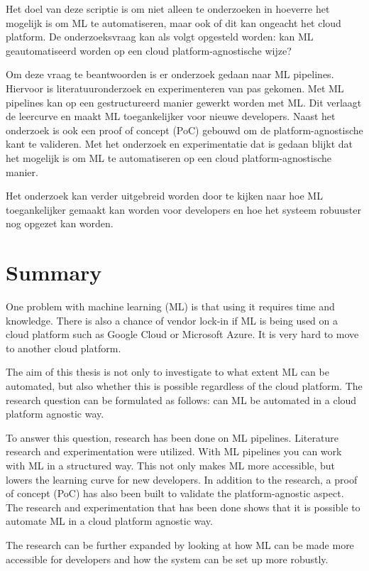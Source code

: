 Het doel van deze scriptie is om niet alleen te onderzoeken in hoeverre het mogelijk is om ML te automatiseren, maar ook of dit kan ongeacht het cloud platform. De onderzoeksvraag kan als volgt opgesteld worden: kan ML geautomatiseerd worden op een cloud platform-agnostische wijze?

Om deze vraag te beantwoorden is er onderzoek gedaan naar ML pipelines. Hiervoor is literatuuronderzoek en experimenteren van pas gekomen. Met ML pipelines kan op een gestructureerd manier gewerkt worden met ML. Dit verlaagt de leercurve en maakt ML toegankelijker voor nieuwe developers. Naast het onderzoek is ook een proof of concept (PoC) gebouwd om de platform-agnostische kant te valideren. Met het onderzoek en experimentatie dat is gedaan blijkt dat het mogelijk is om ML te automatiseren op een cloud platform-agnostische manier.

Het onderzoek kan verder uitgebreid worden door te kijken naar hoe ML toegankelijker gemaakt kan worden voor developers en hoe het systeem robuuster nog opgezet kan worden.

\newpage

\section*{Summary}
One problem with machine learning (ML) is that using it requires time and knowledge. There is also a chance of vendor lock-in if ML is being used on a cloud platform such as Google Cloud or Microsoft Azure. It is very hard to move to another cloud platform.

The aim of this thesis is not only to investigate to what extent ML can be automated, but also whether this is possible regardless of the cloud platform. The research question can be formulated as follows: can ML be automated in a cloud platform agnostic way.

To answer this question, research has been done on ML pipelines. Literature research and experimentation were utilized. With ML pipelines you can work with ML in a structured way. This not only makes ML more accessible, but lowers the learning curve for new developers. In addition to the research, a proof of concept (PoC) has also been built to validate the platform-agnostic aspect. The research and experimentation that has been done shows that it is possible to automate ML in a cloud platform agnostic way.

The research can be further expanded by looking at how ML can be made more accessible for developers and how the system can be set up more robustly. 

\newpage